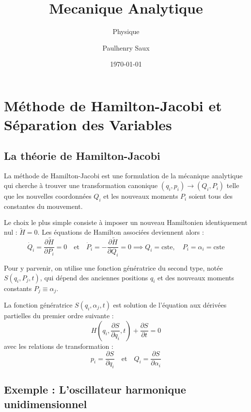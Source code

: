 \documentclass[french]{yLectureNote}
\title{Mecanique Analytique}
\subtitle{Physique}
\author{Paulhenry Saux}
\date{\today}
\begin{document}
\setcounter{chapter}{4}
\chapter{Méthode de Hamilton-Jacobi et Séparation des Variables}

\section{La théorie de Hamilton-Jacobi}

La méthode de Hamilton-Jacobi est une formulation de la mécanique analytique qui cherche à trouver une transformation canonique $(q_i, p_i) \to (Q_i, P_i)$ telle que les nouvelles coordonnées $Q_i$ et les nouveaux moments $P_i$ soient tous des constantes du mouvement.

Le choix le plus simple consiste à imposer un nouveau Hamiltonien identiquement nul : $\tilde{H} = 0$. Les équations de Hamilton associées deviennent alors :
\begin{equation}
    \dot{Q}_i = \frac{\partial \tilde{H}}{\partial P_i} = 0 \quad \text{et} \quad \dot{P}_i = -\frac{\partial \tilde{H}}{\partial Q_i} = 0 \implies Q_i = \text{cste}, \quad P_i = \alpha_i = \text{cste}
\end{equation}

Pour y parvenir, on utilise une fonction génératrice du second type, notée $S(q_i, P_j, t)$, qui dépend des anciennes positions $q_i$ et des nouveaux moments constants $P_j \equiv \alpha_j$.

\begin{definition}
La fonction génératrice $S(q_i, \alpha_j, t)$ est solution de l'équation aux dérivées partielles du premier ordre suivante :
\begin{equation}
    H\left(q_i, \frac{\partial S}{\partial q_i}, t\right) + \frac{\partial S}{\partial t} = 0
\end{equation}
avec les relations de transformation :
\begin{equation}
    p_i = \frac{\partial S}{\partial q_i} \quad \text{et} \quad Q_i = \frac{\partial S}{\partial \alpha_i}
\end{equation}
\end{definition}

\section{Exemple : L'oscillateur harmonique unidimensionnel}
\end{document}
